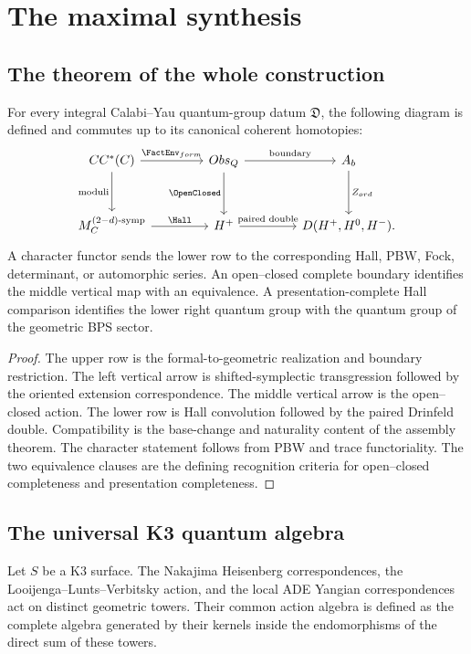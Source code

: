
\part{The maximal synthesis}
\chapter{The theorem of the whole construction}
\begin{theorem}
For every integral Calabi--Yau quantum-group datum $\mathfrak D$, the following diagram is defined and commutes up to its canonical coherent homotopies:
\[
\begin{tikzcd}[column sep=4.1em,row sep=3.1em]
CC^*(\Ccal) \arrow[r,"\FactEnv_{\mathrm{form}}"]
 \arrow[d,"\text{moduli}"'] &
\Obs_Q \arrow[r,"\text{boundary}"] \arrow[d,"\OpenClosed"'] &
A_b \arrow[d,"Z_{\ord}"]\\
\M_{\Ccal}^{(2-d)\text{-symp}}
 \arrow[r,"\Hall"] &
H^+ \arrow[r,"\text{paired double}"] &
D(H^+,H^0,H^-).
\end{tikzcd}
\]
A character functor sends the lower row to the corresponding Hall, PBW, Fock, determinant, or automorphic series.  An open--closed complete boundary identifies the middle vertical map with an equivalence.  A presentation-complete Hall comparison identifies the lower right quantum group with the quantum group of the geometric BPS sector.
\end{theorem}
\begin{proof}
The upper row is the formal-to-geometric realization and boundary restriction.  The left vertical arrow is shifted-symplectic transgression followed by the oriented extension correspondence.  The middle vertical arrow is the open--closed action.  The lower row is Hall convolution followed by the paired Drinfeld double.  Compatibility is the base-change and naturality content of the assembly theorem.  The character statement follows from PBW and trace functoriality.  The two equivalence clauses are the defining recognition criteria for open--closed completeness and presentation completeness.
\end{proof}

\chapter{The universal K3 quantum algebra}
Let $S$ be a K3 surface.  The Nakajima Heisenberg correspondences, the Looijenga--Lunts--Verbitsky action, and the local ADE Yangian correspondences act on distinct geometric towers.  Their common action algebra is defined as the complete algebra generated by their kernels inside the endomorphisms of the direct sum of these towers.

